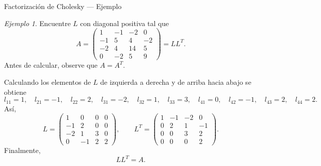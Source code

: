 \documentclass[aspectratio=169,11pt]{beamer}
\theoremstyle{remark}
\newtheorem{Ejem}[definicion]{Ejemplo}
\begin{document}
\begin{frame}[shrink=5]{Factorización de Cholesky — Ejemplo}
\footnotesize
\begin{Ejem}

Encuentre $L$ con diagonal positiva tal que
\[
A=\begin{pmatrix}1 & -1 & -2 & 0\\-1 & 5 & 4 & -2\\-2 & 4 & 14 & 5\\0 & -2 & 5 & 9\end{pmatrix}=LL^T.
\]
Antes de calcular, observe que $A=A^T$.

Calculando los elementos de $L$ de izquierda a derecha y de arriba hacia abajo se obtiene
\[
l_{11}=1,\quad l_{21}=-1,\quad l_{22}=2,\quad l_{31}=-2,\quad l_{32}=1,\quad l_{33}=3,\quad l_{41}=0,\quad l_{42}=-1,\quad l_{43}=2,\quad l_{44}=2.
\]
Así,
\[
L=\begin{pmatrix}1 & 0 & 0 & 0\\-1 & 2 & 0 & 0\\-2 & 1 & 3 & 0\\0 & -1 & 2 & 2\end{pmatrix},\qquad L^T=\begin{pmatrix}1 & -1 & -2 & 0\\0 & 2 & 1 & -1\\0 & 0 & 3 & 2\\0 & 0 & 0 & 2\end{pmatrix}.
\]
Finalmente,
\[
\boxed{LL^T=A}.
\]


\end{Ejem}
\end{frame}
\end{document}
